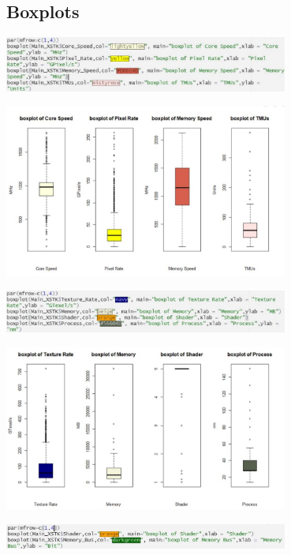 \subsection{Boxplots}
\begin{center}
    \includegraphics[width=0.7\textwidth]{bp1.png}
\end{center}
\begin{center}
    \includegraphics[width=0.7\textwidth]{bp2.png}
\end{center}
\begin{center}
    \includegraphics[width=0.7\textwidth]{bp3.png}
\end{center}
\begin{center}
    \includegraphics[width=0.7\textwidth]{bp4.png}
\end{center}
\begin{center}
    \includegraphics[width=0.7\textwidth]{bp5.png}
\end{center}
